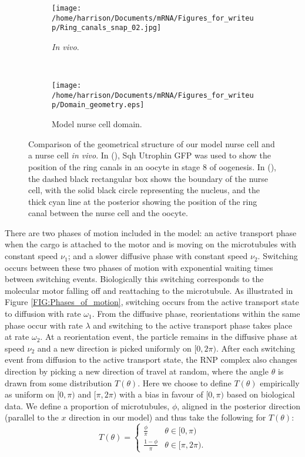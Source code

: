 \documentclass[twocolumn]{biophys}
\begin{document}
\begin{figure}[h]
 \centering
 \begin{subfigure}[b]{0.375\textwidth}
 \texttt{[image: /home/harrison/Documents/mRNA/Figures\_for\_writeup/Ring\_canals\_snap\_02.jpg]}
    \caption[]%
  {{\small \textit{In vivo}.}}    
  \label{fig:vivo}
\end{subfigure}
 ~
  \begin{subfigure}[b]{0.475\textwidth}  
      \centering 
      \texttt{[image: /home/harrison/Documents/mRNA/Figures\_for\_writeup/Domain\_geometry.eps]}
      \caption[]%
      {{\small Model nurse cell domain.}}    
      \label{fig:model}
  \end{subfigure}
  \caption{\small Comparison of the geometrical structure of our model nurse cell and a nurse cell \textit{in vivo}. 
  In (), Sqh Utrophin GFP was used to show the position of the ring canals in an oocyte in stage 8 of oogenesis. 
  In (), the dashed black rectangular box shows the boundary of the nurse cell, with the solid black circle representing the nucleus, and the thick cyan line at the posterior showing the position of the ring canal between the nurse cell and the oocyte.}  
  \label{FIG:geometry}      
\end{figure}

There are two phases of motion included in the model: an active transport phase when the cargo is attached to the motor and is moving on the microtubules with constant speed $\nu_1$; and a slower diffusive phase with constant speed $\nu_2$.
Switching occurs between these two phases of motion with exponential waiting times between switching events.
Biologically this switching corresponds to the molecular motor falling off and reattaching to the microtubule.
As illustrated in Figure \ref{FIG:Phases_of_motion}, switching occurs from the active transport state to diffusion with rate $\omega_1$. 
From the diffusive phase, reorientations within the same phase occur with rate $\lambda$ and switching to the active transport phase takes place at rate $\omega_2$. 
At a reorientation event, the particle remains in the diffusive phase at speed $\nu_2$ and a new direction is picked uniformly on $[0,2\pi)$.
After each switching event from diffusion to the active transport state, the RNP complex also changes direction by picking a new direction of travel at random, where the angle $\theta $ is drawn from some distribution $T(\theta)$. 
Here we choose to define $T(\theta)$ empirically as uniform on $[0,\pi )$ and $[\pi, 2\pi )$ with a bias in favour of $[0,\pi )$ based on biological data.
We define a proportion of microtubules, $\phi$, aligned in the posterior direction (parallel to the $x$ direction in our model) and thus take the following for $T(\theta)$:
\begin{equation*}         
T(\theta) = \begin{cases} \frac{\phi}{\pi} &  \theta \in [0,\pi) \\ \frac{1-\phi}{\pi} &  \theta \in [\pi,2\pi).                       
\end{cases}
\end{equation*}
\end{document}
